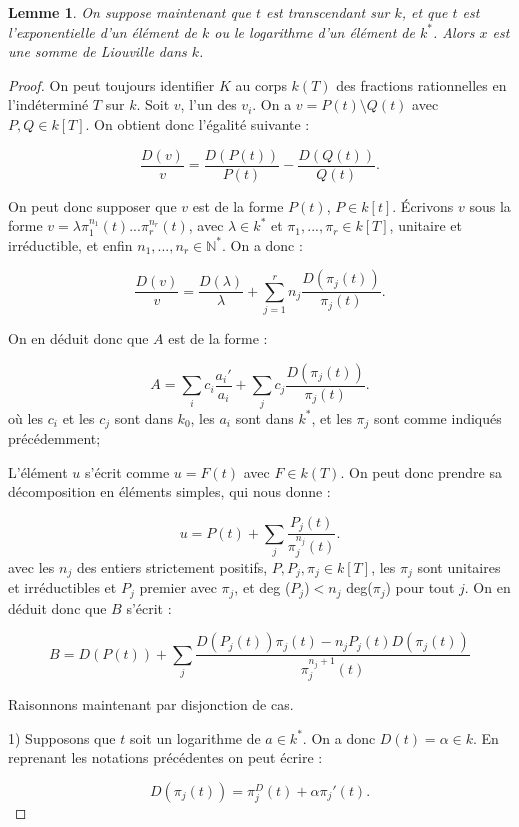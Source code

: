 \documentclass[12pt,a4paper]{report}
\newtheorem{lem}[thm]{\bf Lemme}
\begin{document}
\begin{lem}\rm
On suppose maintenant que $t$ est transcendant sur $k$, et que $t$ est l'exponentielle d'un élément de $k$ ou le logarithme d'un élément de $k^{*}$. Alors $x$ est une somme de Liouville dans $k$. 

\end{lem}
\begin{proof}
On peut toujours identifier $K$ au corps $k(T)$ des fractions rationnelles en l'indéterminé $T$ sur $k$. Soit $v$, l'un des $v_{i}$. On a $v=P(t)\setminus Q(t)$ avec $P,Q \in k[T]$. On obtient donc l'égalité suivante : 

$$\dfrac{D(v)}{v}=\dfrac{D(P(t))}{P(t)}-\dfrac{D(Q(t))}{Q(t)}.$$

On peut donc supposer que $v$ est de la forme $P(t)$, $P\in k[t]$. Écrivons $v$ sous la forme $v=\lambda \pi_{1}^{n_{1}}(t)...\pi_{r}^{n_{r}}(t)$, avec $\lambda \in k^{*}$ et $\pi_{1},...,\pi_{r} \in k[T]$, unitaire et irréductible, et enfin $n_{1},...,n_{r} \in \mathbb{N}^{*}$. On a donc : 

$$\dfrac{D(v)}{v}=\dfrac{D(\lambda)}{\lambda}+\sum_{j=1}^{r}n_{j}\dfrac{D(\pi_{j}(t))}{\pi_{j}(t)}.$$

On en déduit donc que $A$ est de la forme :

$$ A=\sum_{i}c_{i}\dfrac{a_{i}'}{a_{i}} + \sum_{j} c_{j}\dfrac{D(\pi_{j}(t))}{\pi_{j}(t)}.$$
où les $c_{i}$ et les $c_{j}$ sont dans $k_{0}$, les $a_{i}$ sont dans $k^{*}$, et les $\pi_{j}$ sont comme indiqués précédemment; 

L'élément $u$ s'écrit comme $u=F(t)$ avec $F \in k(T)$. On peut donc prendre sa décomposition en éléments simples, qui nous donne : 

$$u=P(t)+\sum_{j}\dfrac{P_{j}(t)}{\pi_{j}^{n_{j}}(t)}.$$
avec les $n_{j}$ des entiers strictement positifs, $P,P_{j}, \pi_{j} \in k[T]$, les $\pi_{j}$ sont unitaires et irréductibles et $P_{j}$ premier avec $\pi_{j}$, et deg ($P_{j}$)$<n_{j}$ deg($\pi_{j}$) pour tout $j$. On en déduit donc que $B$ s'écrit : 

$$B =D(P(t))+\sum_{j}\dfrac{D(P_{j}(t))\pi_{j}(t)-n_{j}P_{j}(t)D(\pi_{j}(t))}{\pi_{j}^{n_{j}+1}(t)}$$

Raisonnons maintenant par disjonction de cas. 

1) Supposons que $t$ soit un logarithme de $a \in k^{*}$. On a donc $D(t)=\alpha \in k.$ En reprenant les notations précédentes on peut écrire : 

$$D(\pi_{j}(t))=\pi_{j}^{D}(t)+\alpha \pi_{j}'(t).$$


\end{proof}
\end{document}
